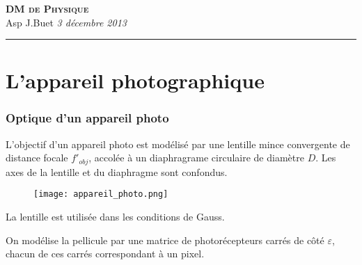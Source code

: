 \documentclass[10pt,a4paper]{article}
\newcommand{\Titre}[3]{\begin{center} {\LARGE\textbf{\textsc{#1}}}\\ #2 \hfill \emph{#3} \\  \hrule\vspace{\baselineskip}\end{center}}
\begin{document}
\Titre{DM de Physique}{Asp J.Buet}{3 décembre 2013}
\thispagestyle{plain}
\pagestyle{plain}


\part*{L'appareil photographique}

\bigskip
\section{Optique d'un appareil photo}

L'objectif d'un appareil photo est modélisé par une lentille mince convergente de distance focale $f'_{obj}$, accolée à un diaphragrame circulaire
de diamètre $D$. Les axes de la lentille et du diaphragme sont confondus.

\begin{figure}[h!]
\center
\texttt{[image: appareil\_photo.png]}
\end{figure}
La lentille est utilisée dans les conditions de Gauss.

On modélise la pellicule par une matrice de photorécepteurs carrés de côté $\varepsilon$, chacun de ces carrés correspondant à un pixel.
\end{document}
